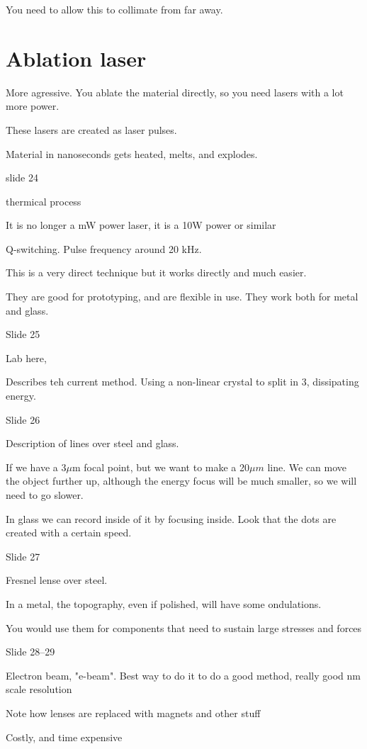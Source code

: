 \documentclass[../main/main.tex]{subfiles}
\begin{document}
You need to allow this to collimate from far away.

\section{Ablation laser}

More agressive. You ablate the material directly, so you need lasers with a lot more power.

These lasers are created as laser pulses.

Material in nanoseconds gets heated, melts, and explodes.


slide 24

thermical process

It is no longer a mW power laser, it is a 10W power or similar

Q-switching. Pulse frequency around 20 kHz.

This is a very direct technique but it works directly and much easier.

They are good for prototyping, and are flexible in use. They work both for metal and glass.

Slide 25

Lab here,

Describes teh current method. Using a non-linear crystal to split in 3, dissipating energy.

Slide 26

Description of lines over steel and glass.

If we have a 3$\mu$m focal point, but we want to make a 20$\mu m$ line. We can move the object further up, although the energy focus will be much smaller, so we will need to go slower.

In glass we can record inside of it by focusing inside. Look that the dots are created with a certain speed.

Slide 27

Fresnel lense over steel.

In a metal, the topography, even if polished, will have some ondulations.

You would use them for components that need to sustain large stresses and forces

Slide 28--29

Electron beam, "e-beam". Best way to do it to do a good method, really good nm scale resolution

Note how lenses are replaced with magnets and other stuff

Costly, and time expensive
\end{document}
